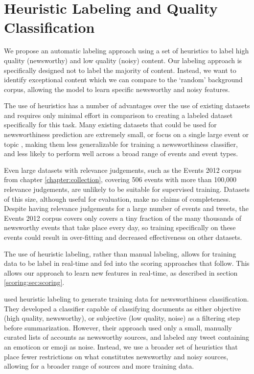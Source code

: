 
\section{Heuristic Labeling and Quality Classification}
\label{scoring:sec:labelling}
We propose an automatic labeling approach using a set of heuristics to label high quality (newsworthy) and low quality (noisy) content.
Our labeling approach is specifically designed not to label the majority of content.
Instead, we want to identify exceptional content which we can compare to the `random' background corpus, allowing the model to learn specific newsworthy and noisy features.

The use of heuristics has a number of advantages over the use of existing datasets and requires only minimal effort in comparison to creating a labeled dataset specifically for this task.
Many existing datasets that could be used for newsworthiness prediction are extremely small, or focus on a single large event or topic \citep{Kang12, Madhawa15}, making them less generalizable for training a newsworthiness classifier, and less likely to perform well across a broad range of events and event types.

Even large datasets with relevance judgements, such as the Events 2012 corpus from chapter \ref{chapter:collection}, covering 506 events with more than 100,000 relevance judgements, are unlikely to be suitable for supervised training.
Datasets of this size, although useful for evaluation, make no claims of completeness.
Despite having relevance judgements  for a large number of events and tweets, the Events 2012 corpus covers only covers a tiny fraction of the many thousands of newsworthy events that take place every day, so training specifically on these events could result in over-fitting and decreased effectiveness on other datasets.

The use of heuristic labeling, rather than manual labeling, allows for training data to be label in real-time and fed into the scoring approaches that follow.
This allows our approach to learn new features in real-time, as described in section \ref{scoring:sec:scoring}.

\cite{Madhawa15} used heuristic labeling to generate training data for newsworthiness classification.
They developed a classifier capable of classifying documents as either objective (high quality, newsworthy), or subjective (low quality, noise) as a filtering step before summarization.
However, their approach used only a small, manually curated lists of accounts as newsworthy sources, and labeled any tweet containing an emoticon or emoji as noise.
Instead, we use a broader set of heuristics that place fewer restrictions on what constitutes newsworthy and noisy sources, allowing for a broader range of sources and more training data.

